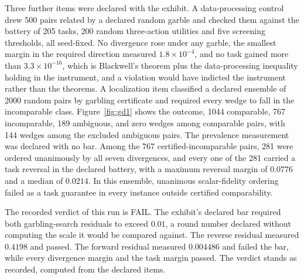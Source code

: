 \documentclass[aps,pre,reprint,nofootinbib]{revtex4-2}
\begin{document}
Three further items were declared with the exhibit.  A
data-processing control drew 500 pairs related by a declared random
garble and checked them against the battery of 205 tasks, 200 random
three-action utilities and five screening thresholds, all seed-fixed.
No divergence rose under any garble, the smallest margin in the
required direction measured $1.8\times10^{-4}$, and no task gained
more than $3.3\times10^{-16}$, which is Blackwell's theorem plus the
data-processing inequality holding in the instrument, and a violation
would have indicted the instrument rather than the theorems.  A
localization item classified a declared ensemble of 2000 random pairs
by garbling certificate and required every wedge to fall in the
incomparable class.  Figure~\ref{fig:gd1} shows the outcome, 1044
comparable, 767 incomparable, 189 ambiguous, and zero wedges among
comparable pairs, with 144 wedges among the excluded ambiguous pairs.
The prevalence measurement was declared with no bar.  Among the 767
certified-incomparable pairs, 281 were
ordered unanimously by all seven divergences, and every one of the
281 carried a task reversal in the declared battery, with a maximum
reversal margin of $0.0776$ and a median of $0.0214$.  In this
ensemble, unanimous scalar-fidelity ordering failed as a task
guarantee in every instance outside certified comparability.

The recorded verdict of this run is FAIL.  The exhibit's declared bar
required both garbling-search residuals to exceed $0.01$, a round
number declared without computing the scale it would be compared
against.  The reverse residual measured $0.4198$ and passed.  The
forward residual measured $0.004486$ and failed the bar, while every
divergence margin and the task margin passed.  The verdict stands as
recorded, computed from the declared items.
\end{document}
